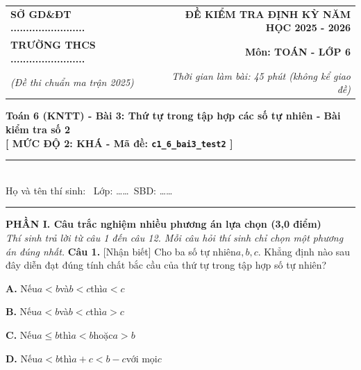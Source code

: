 \documentclass[11pt,a4paper]{article}
\begin{document}
\noindent
\begin{tabular*}{\textwidth}{@{\extracolsep{\fill}}lr@{}}
\textbf{SỞ GD\&ĐT ........................} & \textbf{ĐỀ KIỂM TRA ĐỊNH KỲ NĂM HỌC 2025 - 2026} \\
\textbf{TRƯỜNG THCS ........................} & \textbf{Môn: TOÁN - LỚP 6} \\
\textit{(Đề thi chuẩn ma trận 2025)} & \textit{Thời gian làm bài: 45 phút (không kể giao đề)}
\end{tabular*}

\vspace{6pt}
\begin{center}
{\Large\bfseries Toán 6 (KNTT) - Bài 3: Thứ tự trong tập hợp các số tự nhiên - Bài kiểm tra số 2}\\[4pt]
{\bfseries [ MỨC ĐỘ 2: KHÁ - Mã đề: \texttt{c1\_6\_bai3\_test2} ]}
\end{center}

\vspace{4pt}
\noindent
\rule{\textwidth}{0.8pt}\\[3pt]
Họ và tên thí sinh: \dotfill\ Lớp: \dots\dots\ SBD: \dots\dots\\[-6pt]
\rule{\textwidth}{0.8pt}

\vspace{10pt}

\noindent
\textbf{\large PHẦN I. Câu trắc nghiệm nhiều phương án lựa chọn (3,0 điểm)}\\
\textit{\small Thí sinh trả lời từ câu 1 đến câu 12. Mỗi câu hỏi thí sinh chỉ chọn một phương án đúng nhất.}
\vspace{6pt}
\noindent\textbf{Câu 1.} [Nhận biết] Cho ba số tự nhiên$a, b, c$. Khẳng định nào sau đây diễn đạt đúng tính chất bắc cầu của thứ tự trong tập hợp số tự nhiên?\par\vspace{2pt}
\noindent\textbf{A.} Nếu$a < b$và$b < c$thì$a < c$\par\vspace{1pt}
\noindent\textbf{B.} Nếu$a < b$và$b < c$thì$a > c$\par\vspace{1pt}
\noindent\textbf{C.} Nếu$a \le b$thì$a < b$hoặc$a > b$\par\vspace{1pt}
\noindent\textbf{D.} Nếu$a < b$thì$a + c < b - c$với mọi$c$\par\vspace{5pt}
\end{document}
